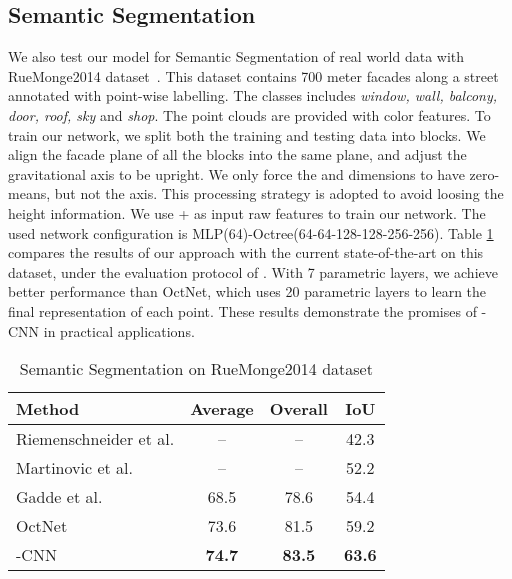 \documentclass[10pt,twocolumn,letterpaper]{article}
\begin{document}
{\subsection{Semantic Segmentation}
\vspace{-2mm}
We also test our model for Semantic Segmentation of real world data with RueMonge2014 dataset~\cite{riemenschneider2014learning}.
This dataset contains 700 meter facades along a street annotated with point-wise labelling. The classes includes \emph{window, wall, balcony, door, roof, sky} and \emph{shop}. The point clouds are provided with color features. To train our network, we split both the training and testing data into  blocks. We align the facade plane of all the blocks into the same plane, and adjust the gravitational axis to be upright. We only force the  and  dimensions to have zero-means, but not the  axis. This processing strategy is adopted to avoid loosing the height information. 
We use + as input raw features to train our network. The used network configuration is MLP(64)-Octree(64-64-128-128-256-256). Table \ref{ruemonge2014_seg} compares the results of our approach with 
the current state-of-the-art on this dataset, 
under the evaluation protocol of \cite{gadde2018efficient}. With 7 parametric layers, we achieve better performance than OctNet,
which uses 20 parametric layers to learn the final representation of each point. These results demonstrate the promises of -CNN in practical applications. 

\begin{table}
\caption{Semantic Segmentation on RueMonge2014 dataset}\label{ruemonge2014_seg}
\begin{tabular}{l|c|c|c}
  \hline
 Method& Average & Overall & IoU \\
  \hline
Riemenschneider et al. \cite{riemenschneider2014learning} & -- & -- & 42.3 \\
Martinovic et al. \cite{martinovic20153d} & -- & -- & 52.2 \\
Gadde et al. \cite{gadde2018efficient} & 68.5 &78.6 &54.4 \\
OctNet  \cite{riegler2017octnet} & 73.6 & 81.5 & 59.2 \\
\hline
-CNN & \textbf{74.7} & \textbf{83.5} & \textbf{63.6} \\
  \hline
\end{tabular}\
\end{table}

}
\end{document}
